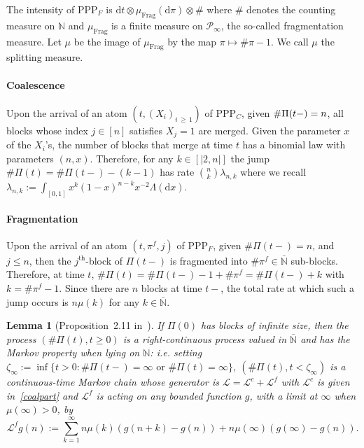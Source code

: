 \documentclass[10pt]{amsart}
\newtheorem{lemm}[theo]{Lemma}\newtheorem{prop}[theo]{Proposition}\newtheorem{coro}[theo]{Corollary}\newtheorem{conj}[theo]{Conjecture}
\theoremstyle{definition}\newtheorem{defi}[theo]{Definition}\newtheorem{rema}[theo]{Remark}\newtheorem{exam}[theo]{Example}\newtheorem{exem}[theo]{Example}\newtheorem{nota}[theo]{Notation}
\newcommand{\ddr}{\mathrm{d}}
\newcommand{\PPP}{\mathrm{PPP}}
\newcommand{\Frag}{\mathrm{Frag}}
\newcommand{\bbN}{\mathbb{N}}
\newcommand{\clL}{\mathcal{L}}
\newcommand{\clP}{\mathcal{P}}
\begin{document}
The intensity of $\PPP_F$ is $\ddr t\otimes \mu_{\Frag}(\ddr \pi)\otimes \#$ where $\#$ denotes the counting measure on $\bbN$ and $\mu_{\Frag}$ is a finite measure on $\clP_\infty$, the so-called fragmentation measure. Let $\mu$ be the image of $\mu_{\Frag}$ by the map $\pi \mapsto \#\pi-1$. We call $\mu$ the splitting measure.

\paragraph{Coalescence} Upon the arrival of an atom $(t,(X_i)_{i\,\geq\,1})$ of $\PPP_C$, given $\#\Pi(t-)\linebreak=n$, all blocks whose index $j\in [n]$ satisfies $X_{j}=1$ are merged. Given the parameter $x$ of the $X_i$'s, the number of blocks that merge at time $t$ has a binomial law with parameters $(n,x)$. Therefore, for any $k\in [|2,n|]$ the jump $\#\Pi(t)=\#\Pi(t-)-(k-1)$ has rate $\binom{n}{k}\lambda_{n,k}$ where we recall $\lambda_{n,k}:=\int_{[0,1]}x^{k}(1-x)^{n-k}x^{-2}\Lambda(\ddr x)$.
\vspace*{1mm}

\paragraph{Fragmentation} Upon the arrival of an atom $(t,\pi^{f},j)$ of $\PPP_F$, given $\#\Pi(t-)=n$, and $j\leq n$, then the $j^{\mathrm{th}}$-block of $\Pi(t-)$ is fragmented into $\#\pi^{f}\in \bar{\bbN}$ sub-blocks. Therefore, at time $t$, $\#\Pi(t)=\#\Pi(t-)-1+\#\pi^{f}=\#\Pi(t-)+k$ with $k=\#\pi^{f}-1$. Since there are $n$ blocks at time $t-$, the total rate at which such a jump occurs is $n\mu(k)$ for any $k\in \bar{\bbN}$.

\begin{lemm}[Proposition~2.11 in~\cite{cdiEFC}]\label{genEFC}
If $\Pi(0)$ has blocks of infinite size, then the process $(\#\Pi(t),t\geq 0)$ is a right-continuous process valued in $\bar{\bbN}$ and has the Markov property when lying on $\bbN$: i.e. setting $\zeta_{\infty}:=\inf\{t>0: \#\Pi(t-)=\infty \text{ or } \#\Pi(t)=\infty\}$, $(\#\Pi(t),t<\zeta_{\infty})$ is a continuous-time Markov chain whose generator is $\clL=\clL^c+\clL^f$ with $\clL^{c}$ is given in~\eqref{coalpart} and $\clL^f$ is acting on any bounded function $g$, with a limit at $\infty$ when $\mu(\infty)>0$, by
\begin{equation}\label{fragpart}
\clL^f g(n):=\sum_{k=1}^{\infty}n\mu(k)(g(n+k)-g(n))+n\mu(\infty)(g(\infty)-g(n)).
\end{equation}
\end{lemm}
\end{document}
